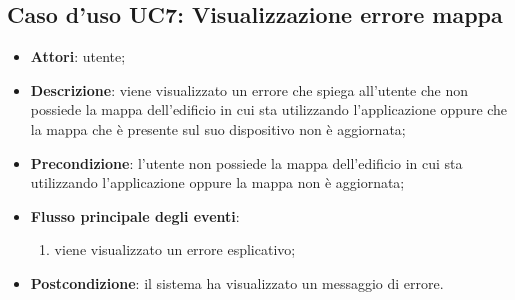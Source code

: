 \documentclass[../AnalisiDeiRequisiti.tex]{subfiles}
\begin{document}
\subsection{Caso d'uso UC7: Visualizzazione errore mappa}
\begin{itemize}
\item \textbf{Attori}: utente;
\item \textbf{Descrizione}: viene visualizzato un errore che spiega all'utente che non possiede la mappa dell'edificio in cui sta utilizzando l'applicazione oppure che la mappa che è presente sul suo dispositivo non è aggiornata; 
      \item \textbf{Precondizione}: l'utente non possiede la mappa dell'edificio in cui sta utilizzando l'applicazione oppure la mappa non è aggiornata;

        \item \textbf{Flusso principale degli eventi}:
          \begin{enumerate}
          \item viene visualizzato un errore esplicativo;

      \end{enumerate}
    \item \textbf{Postcondizione}: il sistema ha visualizzato un messaggio di errore.
  \end{itemize}
 
 
\end{document}
